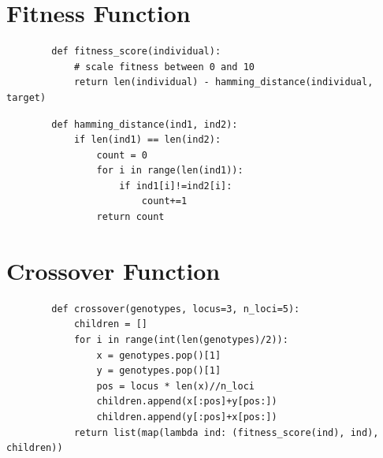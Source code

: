 \documentclass{article}
\begin{document}
		\section{Fitness Function}
		\begin{lstlisting}
		def fitness_score(individual):
			# scale fitness between 0 and 10
			return len(individual) - hamming_distance(individual, target)
		\end{lstlisting}
		\begin{lstlisting}
		def hamming_distance(ind1, ind2):
			if len(ind1) == len(ind2):
				count = 0
				for i in range(len(ind1)):
					if ind1[i]!=ind2[i]:
						count+=1
				return count
		\end{lstlisting}
		\section{Crossover Function}
		\begin{lstlisting}
		def crossover(genotypes, locus=3, n_loci=5):
			children = []
			for i in range(int(len(genotypes)/2)):
				x = genotypes.pop()[1]
				y = genotypes.pop()[1]
				pos = locus * len(x)//n_loci
				children.append(x[:pos]+y[pos:])
				children.append(y[:pos]+x[pos:])
			return list(map(lambda ind: (fitness_score(ind), ind), children))
		\end{lstlisting}
		\newpage
\end{document}

